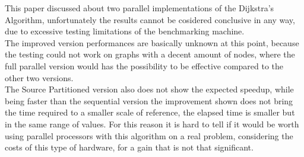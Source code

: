 \documentclass[
	a4paper, %
	12pt, %
]{class}
\begin{document}
This paper discussed about two parallel implementations of the Dijkstra's Algorithm, unfortunately the results cannot be cosidered conclusive in any way,
due to excessive testing limitations of the benchmarking machine. \\

The improved version performances are basically unknown at this point, because the testing could not work on graphs with a decent amount of nodes,
where the full parallel version would has the possibility to be effective compared to the other two versions. \\

The Source Partitioned version also does not show the expected speedup, while being faster than the sequential version the improvement shown does not bring the
time required to a smaller scale of reference, the elapsed time is smaller but in the same range of values. For this reason it is hard to tell if it would be worth using
parallel processors with this algorithm on a real problem, considering the costs of this type of hardware, for a gain that is not that significant. \\

\newpage
\printbibliography %

\end{document}
